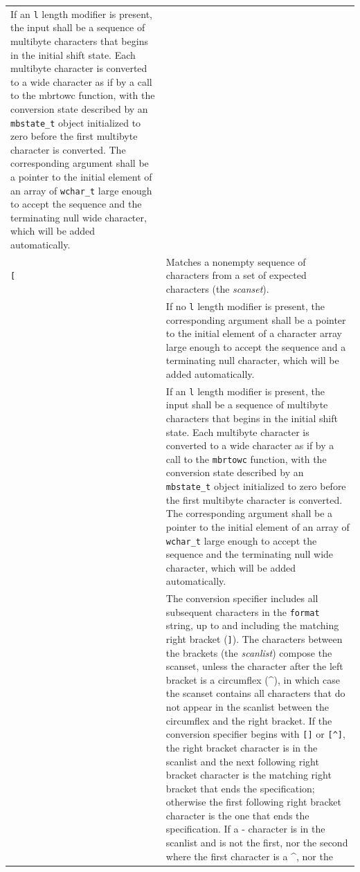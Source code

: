 \begin{longtable}{p{}p{}}
If an \texttt{l} length modifier is present, the input shall be a sequence of
multibyte characters that begins in the initial shift state. Each multibyte
character is converted to a wide character as if by a call to the mbrtowc
function, with the conversion state described by an \texttt{mbstate\_t} object
initialized to zero before the first multibyte character is converted. The
corresponding argument shall be a pointer to the initial element of an array of
\texttt{wchar\_t} large enough to accept the sequence and the terminating null
wide character, which will be added automatically.\\
\texttt{[}&Matches a nonempty sequence of characters from a set of expected
characters (the \textit{scanset})\footnotemark[\value{footnote}].\\
&If no \texttt{l} length modifier is present, the corresponding argument shall
be a pointer to the initial element of a character array large enough to accept
the sequence and a terminating null character, which will be added
automatically.\\
&If an \texttt{l} length modifier is present, the input shall be a sequence of
multibyte characters that begins in the initial shift state. Each multibyte
character is converted to a wide character as if by a call to the
\texttt{mbrtowc} function, with the conversion state described by an
\texttt{mbstate\_t} object initialized to zero before the first multibyte
character is converted. The corresponding argument shall be a pointer to the
initial element of an array of \texttt{wchar\_t} large enough to accept the
sequence and the terminating null wide character, which will be added
automatically.\\
&The conversion specifier includes all subsequent characters in the
\texttt{format} string, up to and including the matching right bracket
(\texttt{]}). The characters between the brackets (the \textit{scanlist})
compose the scanset, unless the character after the left bracket is a
circumflex (\^{}), in which case the scanset contains all 
characters that do not appear in the scanlist between the circumflex and the
right bracket. If the conversion specifier begins with \texttt{[]} or
\texttt{[\^{}]}, the right bracket character is in the scanlist and
the next following right bracket character is the matching right bracket that
ends the specification; otherwise the first following right bracket character
is the one that ends the specification. If a - character is in the scanlist and
is not the first, nor the second where the first character is a \^{}, nor the

\end{longtable}
